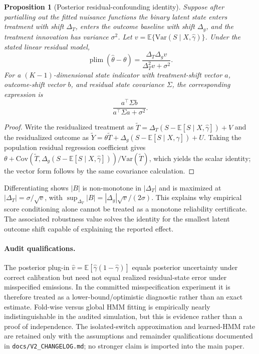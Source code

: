\documentclass[twoside]{article}
\newtheorem{proposition}{Proposition}
\theoremstyle{definition}
\newcommand{\E}{\mathbb{E}}
\newcommand{\Var}{\mathrm{Var}}
\newcommand{\Cov}{\mathrm{Cov}}
\DeclareMathOperator*{\plim}{plim}
\begin{document}
\begin{proposition}[Posterior residual-confounding identity]
Suppose after partialling out the fitted nuisance functions the binary latent state enters treatment with shift $\Delta_T$, enters the outcome baseline with shift $\Delta_g$, and the treatment innovation has variance $\sigma^2$. Let $v=\E\{\Var(S\mid X,\hat\gamma)\}$. Under the stated linear residual model,
\[
\plim(\hat\theta-\theta)=
\frac{\Delta_T\Delta_g v}{\Delta_T^2v+\sigma^2}.
\]
For a $(K-1)$-dimensional state indicator with treatment-shift vector $a$, outcome-shift vector $b$, and residual state covariance $\Sigma$, the corresponding expression is
\[
\frac{a^\top\Sigma b}{a^\top\Sigma a+\sigma^2}.
\]
\end{proposition}
\begin{proof}
Write the residualized treatment as $\widetilde T=\Delta_T(S-\E[S\mid X,\hat\gamma])+V$ and the residualized outcome as $\widetilde Y=\theta\widetilde T+\Delta_g(S-\E[S\mid X,\hat\gamma])+U$. Taking the population residual regression coefficient gives $\theta+\Cov(\widetilde T,\Delta_g(S-\E[S\mid X,\hat\gamma]))/\Var(\widetilde T)$, which yields the scalar identity; the vector form follows by the same covariance calculation.
\end{proof}

Differentiating shows $|B|$ is non-monotone in $|\Delta_T|$ and is maximized at $|\Delta_T|=\sigma/\sqrt v$, with $\sup_{\Delta_T}|B|=|\Delta_g|\sqrt v/(2\sigma)$. This explains why empirical score conditioning alone cannot be treated as a monotone reliability certificate. The associated robustness value solves the identity for the smallest latent outcome shift capable of explaining the reported effect.

\paragraph{Audit qualifications.}
The posterior plug-in $\hat v=\E[\hat\gamma(1-\hat\gamma)]$ equals posterior uncertainty under correct calibration but need not equal realized residual-state error under misspecified emissions. In the committed misspecification experiment it is therefore treated as a lower-bound/optimistic diagnostic rather than an exact estimate. Fold-wise versus global HMM fitting is empirically nearly indistinguishable in the audited simulation, but this is evidence rather than a proof of independence. The isolated-switch approximation and learned-HMM rate are retained only with the assumptions and remainder qualifications documented in \texttt{docs/V2\_CHANGELOG.md}; no stronger claim is imported into the main paper.
\end{document}
